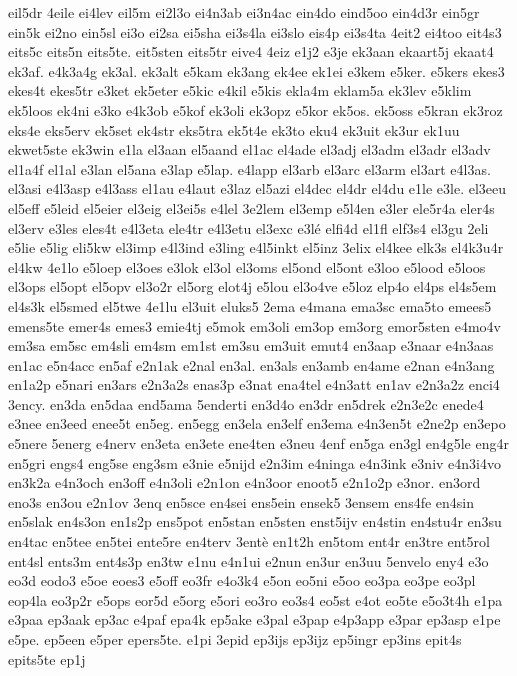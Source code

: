 {eil5dr
4eile
ei4lev
eil5m
ei2l3o
ei4n3ab
ei3n4ac
ein4do
eind5oo
ein4d3r
ein5gr
ein5k
ei2no
ein5sl
ei3o
ei2sa
ei5sha
ei3s4la
ei3slo
eis4p
ei3s4ta
4eit2
ei4too
eit4s3
eits5c
eits5n
eits5te.
eit5sten
eits5tr
eive4
4eiz
e1j2
e3je
ek3aan
ekaart5j
ekaat4
ek3af.
e4k3a4g
ek3al.
ek3alt
e5kam
ek3ang
ek4ee
ek1ei
e3kem
e5ker.
e5kers
ekes3
ekes4t
ekes5tr
e3ket
ek5eter
e5kic
e4kil
e5kis
ekla4m
eklam5a
ek3lev
e5klim
ek5loos
ek4ni
e3ko
e4k3ob
e5kof
ek3oli
ek3opz
e5kor
ek5os.
ek5oss
e5kran
ek3roz
eks4e
eks5erv
ek5set
ek4str
eks5tra
ek5t4e
ek3to
eku4
ek3uit
ek3ur
ek1uu
ekwet5ste
ek3win
e1la
el3aan
el5aand
el1ac
el4ade
el3adj
el3adm
el3adr
el3adv
el1a4f
el1al
e3lan
el5ana
e3lap
e5lap.
e4lapp
el3arb
el3arc
el3arm
el3art
e4l3as.
el3asi
e4l3asp
e4l3ass
el1au
e4laut
e3laz
el5azi
el4dec
el4dr
el4du
e1le
e3le.
el3eeu
el5eff
e5leid
el5eier
el3eig
el3ei5s
e4lel
3e2lem
el3emp
e5l4en
e3ler
ele5r4a
eler4s
el3erv
e3les
eles4t
e4l3eta
ele4tr
e4l3etu
el3exc
e3lé
elfi4d
el1fl
elf3s4
el3gu
2eli
e5lie
e5lig
eli5kw
el3imp
e4l3ind
e3ling
e4l5inkt
el5inz
3elix
el4kee
elk3s
el4k3u4r
el4kw
4e1lo
e5loep
el3oes
e3lok
el3ol
el3oms
el5ond
el5ont
e3loo
e5lood
e5loos
el3ops
el5opt
el5opv
el3o2r
el5org
elot4j
e5lou
el3o4ve
e5loz
elp4o
el4ps
el4s5em
el4s3k
el5smed
el5twe
4e1lu
el3uit
eluks5
2ema
e4mana
ema3sc
ema5to
emees5
emens5te
emer4s
emes3
emie4tj
e5mok
em3oli
em3op
em3org
emor5sten
e4mo4v
em3sa
em5sc
em4sli
em4sm
em1st
em3su
em3uit
emut4
en3aap
e3naar
e4n3aas
en1ac
e5n4acc
en5af
e2n1ak
e2nal
en3al.
en3als
en3amb
en4ame
e2nan
e4n3ang
en1a2p
e5nari
en3ars
e2n3a2s
enas3p
e3nat
ena4tel
e4n3att
en1av
e2n3a2z
enci4
3ency.
en3da
en5daa
end5ama
5enderti
en3d4o
en3dr
en5drek
e2n3e2c
enede4
e3nee
en3eed
enee5t
en5eg.
en5egg
en3ela
en3elf
en3ema
e4n3en5t
e2ne2p
en3epo
e5nere
5energ
e4nerv
en3eta
en3ete
ene4ten
e3neu
4enf
en5ga
en3gl
en4g5le
eng4r
en5gri
engs4
eng5se
eng3sm
e3nie
e5nijd
e2n3im
e4ninga
e4n3ink
e3niv
e4n3i4vo
en3k2a
e4n3och
en3off
e4n3oli
e2n1on
e4n3oor
enoot5
e2n1o2p
e3nor.
en3ord
eno3s
en3ou
e2n1ov
3enq
en5sce
en4sei
ens5ein
ensek5
3ensem
ens4fe
en4sin
en5slak
en4s3on
en1s2p
ens5pot
en5stan
en5sten
enst5ijv
en4stin
en4stu4r
en3su
en4tac
en5tee
en5tei
ente5re
en4terv
3entè
en1t2h
en5tom
ent4r
en3tre
ent5rol
ent4sl
ents3m
ent4s3p
en3tw
e1nu
e4n1ui
e2nun
en3ur
en3uu
5envelo
eny4
e3o
eo3d
eodo3
e5oe
eoes3
e5off
eo3fr
e4o3k4
e5on
eo5ni
e5oo
eo3pa
eo3pe
eo3pl
eop4la
eo3p2r
e5ops
eor5d
e5org
e5ori
eo3ro
eo3s4
eo5st
e4ot
eo5te
e5o3t4h
e1pa
e3paa
ep3aak
ep3ac
e4paf
epa4k
ep5ake
e3pal
e3pap
e4p3app
e3par
ep3asp
e1pe
e5pe.
ep5een
e5per
epers5te.
e1pi
3epid
ep3ijs
ep3ijz
ep5ingr
ep3ins
epit4s
epits5te
ep1j
}
